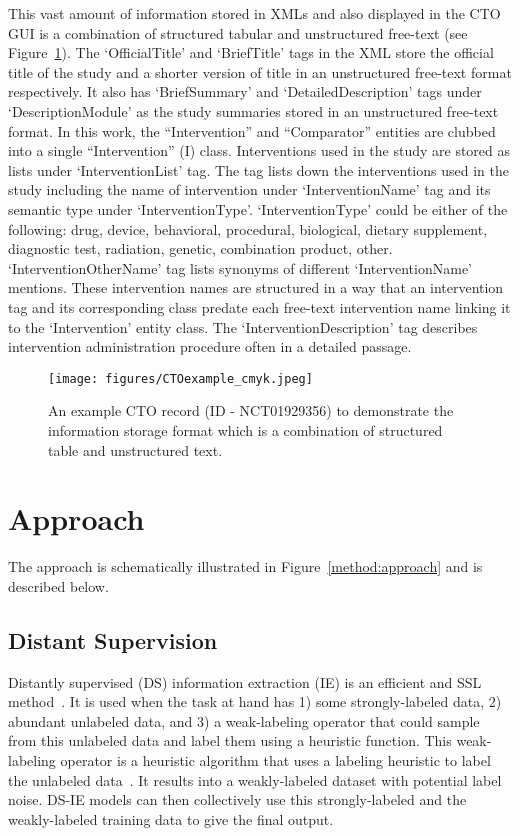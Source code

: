 \documentclass[letterpaper]{article} %
\begin{document}
This vast amount of information stored in XMLs and also displayed in the CTO GUI is a combination of structured tabular and unstructured free-text (see Figure~\ref{fig:CTO_example}).
The `OfficialTitle' and `BriefTitle' tags in the XML store the official title of the study and a shorter version of title in an unstructured free-text format respectively.
It also has `BriefSummary' and `DetailedDescription' tags under `DescriptionModule' as the study summaries stored in an unstructured free-text format.
In this work, the ``Intervention'' and ``Comparator'' entities are clubbed into a single ``Intervention'' (I) class.
Interventions used in the study are stored as lists under `InterventionList' tag.
The tag lists down the interventions used in the study including the name of intervention under `InterventionName' tag and its semantic type under `InterventionType'.
`InterventionType' could be either of the following: drug, device, behavioral, procedural, biological, dietary supplement, diagnostic test, radiation, genetic, combination product, other.
`InterventionOtherName' tag lists synonyms of different `InterventionName' mentions.
These intervention names are structured in a way that an intervention tag and its corresponding class predate each free-text intervention name linking it to the `Intervention' entity class.
The `InterventionDescription' tag describes intervention administration procedure often in a detailed passage.
%
\begin{figure}[t]
\centering
\texttt{[image: figures/CTOexample\_cmyk.jpeg]}
\caption{An example CTO record (ID - NCT01929356) to demonstrate the information storage format which is a combination of structured table and unstructured text.}
\label{fig:CTO_example}
\end{figure}
%
\section{Approach}
\label{sec:methods}
%
The approach is schematically illustrated in Figure~\ref{method:approach} and is described below.
%
\subsection{Distant Supervision}
\label{subsec:ds}
%
Distantly supervised (DS) information extraction (IE) is an efficient and SSL method~\cite{etzioni2008open,wen2019efficient}.
It is used when the task at hand has 1) some strongly-labeled data, 2) abundant unlabeled data, and 3) a weak-labeling operator that could sample from this unlabeled data and label them using a heuristic function.
This weak-labeling operator is a heuristic algorithm that uses a labeling heuristic to label the unlabeled data~\cite{pinto2003table, greaves2014relation}.
It results into a weakly-labeled dataset with potential label noise.
DS-IE models can then collectively use this strongly-labeled and the weakly-labeled training data to give the final output.
%
\end{document}

